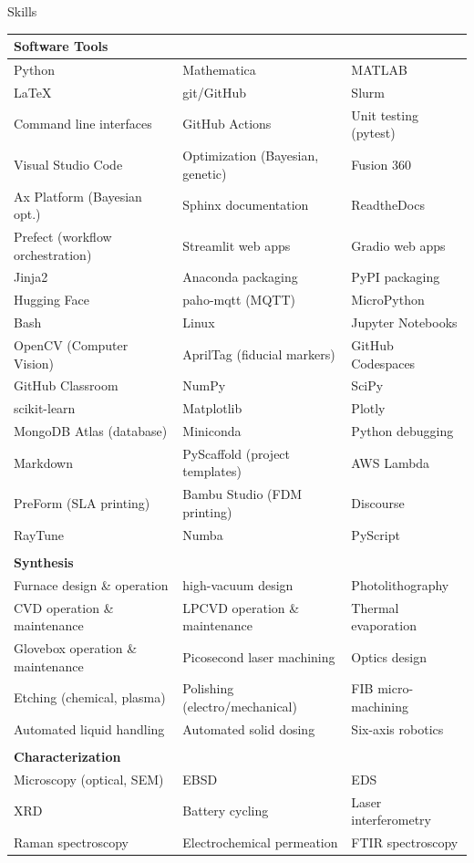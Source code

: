 \documentclass{resume} %
\begin{document}
\begin{rSection}{Skills}
\begin{longtable}{ l l l }
{\bf Software Tools} \\
\hline
Python & Mathematica & MATLAB \\
LaTeX & git/GitHub & Slurm \\
Command line interfaces & GitHub Actions & Unit testing (pytest) \\
Visual Studio Code & Optimization (Bayesian, genetic) & Fusion 360 \\
Ax Platform (Bayesian opt.) & Sphinx documentation & ReadtheDocs \\
Prefect (workflow orchestration) & Streamlit web apps & Gradio web apps \\
Jinja2 & Anaconda packaging & PyPI packaging \\
Hugging Face & paho-mqtt (MQTT) & MicroPython \\
Bash & Linux & Jupyter Notebooks \\
OpenCV (Computer Vision) & AprilTag (fiducial markers) & GitHub Codespaces \\
GitHub Classroom & NumPy & SciPy \\
scikit-learn & Matplotlib & Plotly \\
MongoDB Atlas (database) & Miniconda & Python debugging \\
Markdown & PyScaffold (project templates) & AWS Lambda \\
PreForm (SLA printing) & Bambu Studio (FDM printing) & Discourse \\
RayTune & Numba & PyScript \\
\\
{\bf Synthesis} & &\\
\hline
Furnace design \& operation & high-vacuum design & Photolithography \\
CVD operation \& maintenance & LPCVD operation \& maintenance & Thermal evaporation \\
Glovebox operation \& maintenance & Picosecond laser machining & Optics design \\
Etching (chemical, plasma) & Polishing (electro/mechanical) & FIB micro-machining \\
Automated liquid handling & Automated solid dosing & Six-axis robotics
\\
\\
{\bf Characterization} & & \\
\hline
Microscopy (optical, SEM) & EBSD & EDS \\
XRD & Battery cycling & Laser interferometry \\ Raman spectroscopy & Electrochemical permeation & FTIR spectroscopy \\
\end{longtable}
\end{rSection}
\end{document}
